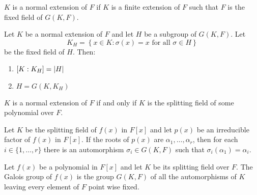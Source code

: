 \begin{definition}\label{def:normal-extension}
	$K$ is a normal extension of $F$ if $K$ is a finite extension of $F$ such that
	$F$ is the fixed field of $G(K,F)$.
\end{definition}

\begin{theorem}\label{thm:on-the-subfield-subgroup-correspondence}
	Let $K$ be a normal extension of $F$ and let $H$ be a subgroup of $G(K,F)$.
	Let
	\[
		K_{H}=\left\{{x}\in{K}:\sigma(x)=x\text{ for all }{\sigma}\in{H}\right\}
	\]
	be the fixed field of $H$. Then:
	\begin{enumerate}
		\item $[K:K_{H}]=\lvert H\rvert$
		\item $H=G(K,K_{H})$
	\end{enumerate}
\end{theorem}

\begin{theorem}\label{thm:a-characterization-of-normality}
	$K$ is a normal extension of $F$ if and only if $K$ is the splitting field of
	some polynomial over $F$.
\end{theorem}

\begin{lemma}\label{lem:the-action-of-the-galois-group-of-a-normal-extension-is-transitive}
	Let $K$ be the splitting field of $f(x)$ in $F[x]$ and let $p(x)$ be an
	irreducible factor of $f(x)$ in $F[x]$. If the roots of $p(x)$ are
	$\alpha_{1},\ldots,\alpha_{r}$, then for each ${i}\in\{1,\ldots,r\}$ there is
	an automorphism ${\sigma_{i}}\in{G(K,F)}$ such that
	$\sigma_{i}(\alpha_{1})=\alpha_{i}$.
\end{lemma}

\begin{definition}\label{def:galois-group}
	Let $f(x)$ be a polynomial in $F[x]$ and let $K$ be its splitting field over
	$F$. The Galois group of $f(x)$ is the group $G(K,F)$ of all the automorphisms
	of $K$ leaving every element of $F$ point wise fixed.
\end{definition}

